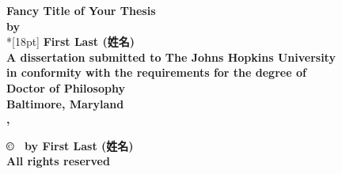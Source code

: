 \documentclass[12pt]{report}
\begin{document}
\begin{CJK*}{UTF8}{gbsn} %



\newcommand{\bin}[2]{\left(\begin{array}{@{}c@{}} #1 \\ #2
             \end{array}\right) }
\renewcommand{\contentsname}{Table of Contents}
\baselineskip=24pt
 
\thispagestyle{empty}
\begin{center}
\vspace*{.25in}
{\bf\LARGE{Fancy Title of Your Thesis}}\\ %
\vspace*{.75in}
{\bf by} \\*[18pt]
\vspace*{.2in}
{\bf First Last (姓名)}\\ %
\vspace*{1in}
{\bf A dissertation submitted to The Johns Hopkins University\\
in conformity with the requirements for the degree of\\
Doctor of Philosophy }\\
\vspace*{.75in}
{\bf Baltimore, Maryland} \\
{\bf \monthname, \the\year} \\     %
\vspace*{.5in}
\begin{small}
{\bf \copyright{ }\the\year\ by First Last (姓名)} \\ %
{\bf All rights reserved}
\end{small}
\end{center}
\newpage 

\pagestyle{plain}
\setcounter{page}{2}




\pagestyle{plain}
\baselineskip=24pt
\tableofcontents
\listoftables
\listoffigures


\end{CJK*}
\end{document}

